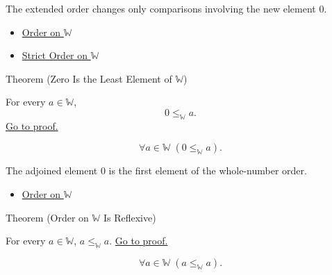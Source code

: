 \begin{remark*}[Interpretation]
The extended order changes only comparisons involving the new element $0$.
\end{remark*}

\begin{dependencies}
\begin{itemize}
  \item \hyperref[def:order-on-w]{Order on $\mathbb{W}$}
  \item \hyperref[def:strict-order-on-w]{Strict Order on $\mathbb{W}$}
\end{itemize}
\end{dependencies}

\begin{theorembox}{Theorem (Zero Is the Least Element of \texorpdfstring{$\mathbb{W}$}{W})}
\begin{theorem}
\label{thm:zero-least-element-of-w}
For every $a\in\mathbb{W}$,
\[
0\leq_{\mathbb{W}}a.
\]
\hyperref[prf:zero-least-element-of-w]{Go to proof.}
\end{theorem}
\end{theorembox}

\begin{remark*}
\[
\forall a\in\mathbb{W}\;(0\leq_{\mathbb{W}}a).
\]
\end{remark*}

\begin{remark*}[Interpretation]
The adjoined element $0$ is the first element of the whole-number order.
\end{remark*}

\begin{dependencies}
\begin{itemize}
  \item \hyperref[def:order-on-w]{Order on $\mathbb{W}$}
\end{itemize}
\end{dependencies}

\begin{theorembox}{Theorem (Order on \texorpdfstring{$\mathbb{W}$}{W} Is Reflexive)}
\begin{theorem}
\label{thm:order-on-w-reflexive}
For every $a\in\mathbb{W}$, $a\leq_{\mathbb{W}}a$.
\hyperref[prf:order-on-w-reflexive]{Go to proof.}
\end{theorem}
\end{theorembox}

\begin{remark*}
\[
\forall a\in\mathbb{W}\;(a\leq_{\mathbb{W}}a).
\]
\end{remark*}

